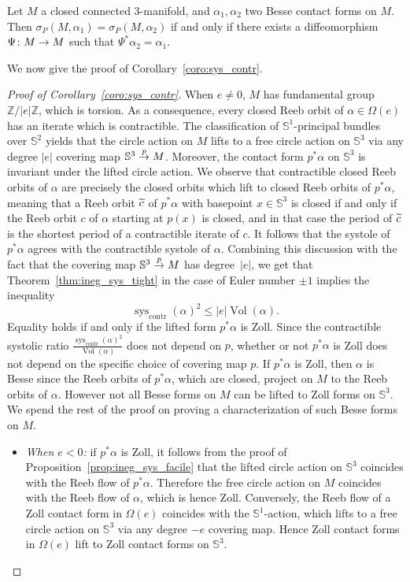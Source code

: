 \documentclass[AHL,Unicode,longabstracts]{cedram}
\DeclareMathOperator{\vol}{Vol}
\DeclareMathOperator{\sys}{sys}
\DeclareMathOperator{\contr}{contr}
\newcommand{\bbS}{\mathbb{S}}
\newcommand{\bbZ}{\mathbb{Z}}
\renewcommand*{\to}{\mathchoice{\longrightarrow}{\rightarrow}{\rightarrow}{\rightarrow}}
\let\oldtilde\tilde
\renewcommand*{\tilde}[1]{\mathchoice{\widetilde{#1}}{\widetilde{#1}}{\oldtilde{#1}}{\oldtilde{#1}}}
\newcommand{\bbS}{\mathbb{S}}
\begin{document}
\begin{theo}[{\cite[Theorem~1.5]{MR4152621}}]\label{thm:Besse_CGM}
Let $M$ a closed connected $3$-manifold, and $\alpha_1, \alpha_2$ two Besse contact forms on $M$. Then $\sigma_P(M,\alpha_1) = \sigma_P(M,\alpha_2)$ if and only if there exists a diffeomorphism $\Psi \colon M \to M$ such that $\Psi^* \alpha_2 = \alpha_1$.
\end{theo}

We now give the proof of Corollary~\ref{coro:sys_contr}.

\begin{proof}[{Proof of Corollary~\ref{coro:sys_contr}}]
When $e \neq 0$, $M$ has fundamental group $\bbZ/|e| \bbZ$, which is torsion. As a consequence, every closed Reeb orbit of $\alpha \in \Omega(e)$ has an iterate which is contractible. The classification of $\bbS^1$-principal bundles over $\bbS^2$ yields that the circle action on $M$ lifts to a free circle action on $\bbS^3$ via any degree $|e|$ covering map $\bbS^3 \overset{p}{\to} M$. Moreover, the contact form $p^* \alpha$ on $\bbS^3$ is invariant under the lifted circle action. We observe that contractible closed Reeb orbits of $\alpha$ are precisely the closed orbits which lift to closed Reeb orbits of $p^* \alpha$, meaning that a Reeb orbit $\tilde c$ of $p^* \alpha$ with basepoint $x \in \bbS^3$ is closed if and only if the Reeb orbit $c$ of $\alpha$ starting at $p(x)$ is closed, and in that case the period of $\tilde c$ is the shortest period of a contractible iterate of $c$. It follows that the systole of $p^* \alpha$ agrees with the contractible systole of $\alpha$. Combining this discussion with the fact that the covering map $\bbS^3 \overset{p}{\to} M$ has degree~$|e|$, we get that Theorem~\ref{thm:ineg_sys_tight} in the case of Euler number $\pm 1$ implies the inequality
\[
\sys_{\contr}(\alpha)^2 \leq |e| \vol(\alpha).
\]
Equality holds if and only if the lifted form $p^* \alpha$ is Zoll. Since the contractible systolic ratio $\frac{\sys_{\contr}(\alpha)^2}{\vol(\alpha)}$ does not depend on $p$, whether or not $p^* \alpha$ is Zoll does not depend on the specific choice of covering map $p$. If $p^*\alpha$ is Zoll, then $\alpha$ is Besse since the Reeb orbits of $p^* \alpha$, which are closed, project on $M$ to the Reeb orbits of $\alpha$. However not all Besse forms on $M$ can be lifted to Zoll forms on $\bbS^3$. We spend the rest of the proof on proving a characterization of such Besse forms on $M$.
\begin{itemize}
\item \emph{When $e < 0$:} if $p^* \alpha$ is Zoll, it follows from the proof of Proposition~\ref{prop:ineg_sys_facile} that the lifted circle action on $\bbS^3$ coincides with the Reeb flow of $p^* \alpha$. Therefore the free circle action on $M$ coincides with the Reeb flow of $\alpha$, which is hence Zoll. Conversely, the Reeb flow of a Zoll contact form in $\Omega(e)$ coincides with the $\bbS^1$-action, which lifts to a free circle action on $\bbS^3$ via any degree $-e$ covering map. Hence Zoll contact forms in $\Omega(e)$ lift to Zoll contact forms on $\bbS^3$.


\end{itemize}
\end{proof}
\end{document}
